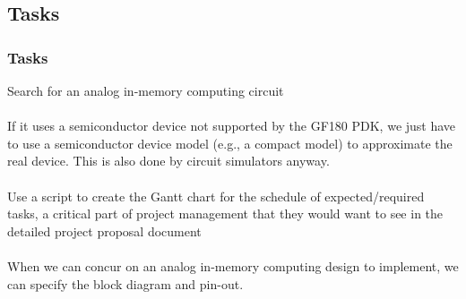 \documentclass[xcolor={usenames,dvipsnames},hyperref={hyperindex,bookmarks}]{beamer}
\begin{document}
%		




\subsection{Tasks}


\begin{frame}
	\frametitle{Tasks}
	
	Search for an analog in-memory computing circuit \\
	\ \\
	If it uses a semiconductor device not supported by the GF180 PDK, we just have to use a semiconductor device model (e.g., a compact model) to approximate the real device. This is also done by circuit simulators anyway. \\
	\ \\
	Use a script to create the Gantt chart for the schedule of expected/required tasks, a critical part of project management that they would want to see in the detailed project proposal document \\
	\ \\
	When we can concur on an analog in-memory computing design to implement, we can specify the block diagram and pin-out.
	
\end{frame}
\end{document}
